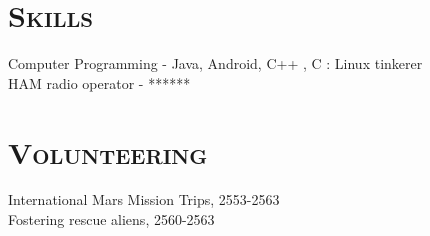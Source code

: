 \documentclass{res}
\begin{document}
{\begin{resume}
\section{\textsc{Skills}}\vspace{.15cm}
Computer Programming - Java, Android, C++ , C : Linux tinkerer\\
HAM radio operator - ******

\section{\textsc{Volunteering}}\vspace{.15cm}
International Mars Mission Trips, 2553-2563\\
Fostering rescue aliens, 2560-2563
\end{resume}
\vfill} %
\end{document}

